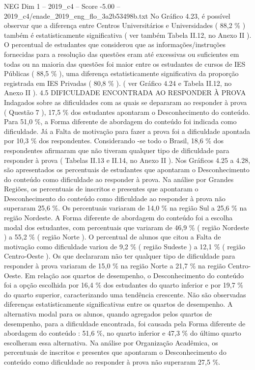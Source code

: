 \begin{textsample}{NEG Dim 1 – 2019\_c4 – Score -5.00 – 2019\_c4/enade\_2019\_eng\_flo\_3a2b53498b.txt}
No Gráfico 4.23, é possível observar que a diferença entre Centros Universitários e Universidades ( 88,2 \% ) também é estatisticamente significativa ( ver também Tabela II.12, no Anexo II ).
O percentual de estudantes que considerou que as informações/instruções fornecidas para a resolução das questões eram até excessivas ou suficientes em todas ou na maioria das questões foi maior entre os estudantes de cursos de IES Públicas ( 88,5 \% ), uma diferença estatisticamente significativa da proporção registrada em IES Privadas ( 80,8 \% ). ( ver Gráfico 4.24 e Tabela II.12, no Anexo II ). 4.5 DIFICULDADE ENCONTRADA AO RESPONDER À PROVA Indagados sobre as dificuldades com as quais se depararam ao responder à prova ( Questão 7 ), 17,5 \% dos estudantes apontaram o Desconhecimento do conteúdo.
Para 51,0 \%, a Forma diferente de abordagem do conteúdo foi indicada como dificuldade.
Já a Falta de motivação para fazer a prova foi a dificuldade apontada por 10,3 \% dos respondentes.
Considerando -se todo o Brasil, 18,6 \% dos respondentes afirmaram que não tiveram qualquer tipo de dificuldade para responder à prova ( Tabelas II.13 e II.14, no Anexo II ).
Nos Gráficos 4.25 a 4.28, são apresentados os percentuais de estudantes que apontaram o Desconhecimento do conteúdo como dificuldade ao responder à prova.
Na análise por Grandes Regiões, os percentuais de inscritos e presentes que apontaram o Desconhecimento do conteúdo como dificuldade ao responder à prova não superaram 25,6 \%.
Os percentuais variaram de 14,0 \% na região Sul a 25,6 \% na região Nordeste.
A Forma diferente de abordagem do conteúdo foi a escolha modal dos estudantes, com percentuais que variaram de 46,9 \% ( região Nordeste ) a 55,2 \% ( região Norte ).
O percentual de alunos que citou a Falta de motivação como dificuldade variou de 9,2 \% ( região Sudeste ) a 12,1 \% ( região Centro-Oeste ).
Os que declararam não ter qualquer tipo de dificuldade para responder à prova variaram de 15,0 \% na região Norte a 21,7 \% na região Centro-Oeste.
Em relação aos quartos de desempenho, o Desconhecimento do conteúdo foi a opção escolhida por 16,4 \% dos estudantes do quarto inferior e por 19,7 \% do quarto superior, caracterizando uma tendência crescente.
Não são observadas diferenças estatisticamente significativas entre os quartos de desempenho.
A alternativa modal para os alunos, quando agregados pelos quartos de desempenho, para a dificuldade encontrada, foi causada pela Forma diferente de abordagem do conteúdo : 51,6 \%, no quarto inferior e 47,3 \% do último quarto escolheram essa alternativa.
Na análise por Organização Acadêmica, os percentuais de inscritos e presentes que apontaram o Desconhecimento do conteúdo como dificuldade ao responder à prova não superaram 27,5 \%.

\end{textsample}
